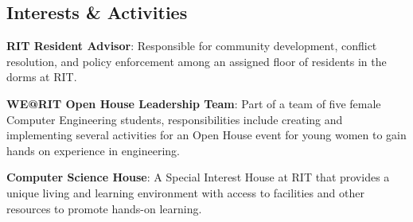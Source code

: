 \documentclass[a4paper,margin,line]{resume}
\begin{document}
\begin{resume}
\section{\mysidestyle Interests \& Activities}
    \begin{asparablank}
        \item \textbf{RIT Resident Advisor}: Responsible for community development, conflict resolution, and policy enforcement among an assigned floor of residents in the dorms at RIT.\\
        \item \textbf{WE@RIT Open House Leadership Team}: Part of a team of five female Computer Engineering students, responsibilities include creating and implementing several activities for an Open House event for young women to gain hands on experience in engineering.\\
        \item \textbf{Computer Science House}: A Special Interest House at RIT that provides a unique living and learning environment with access to facilities and other resources to promote hands-on learning.\\
    \end{asparablank}
\end{resume}
\end{document}
